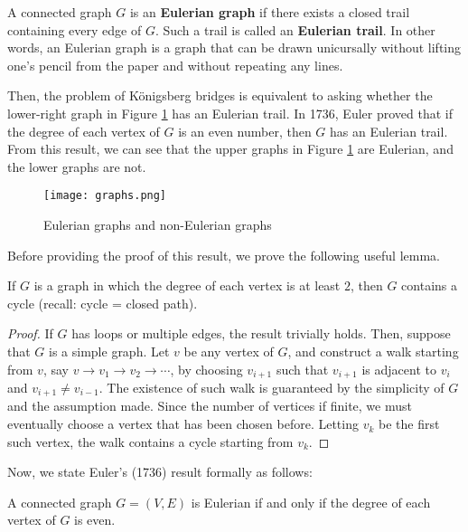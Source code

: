 \documentclass[11pt, A4paper, openany, uplatex]{book}
\begin{document}
\begin{appendices}
A connected graph $G$ is an \textbf{Eulerian graph} if there exists a closed trail containing every edge of $G$.
Such a trail is called an \textbf{Eulerian trail}.
In other words, an Eulerian graph is a graph that can be drawn unicursally without lifting one's pencil from the paper and without repeating any lines.

Then, the problem of K\"onigsberg bridges is equivalent to asking whether the lower-right graph in Figure \ref{fig:euler} has an Eulerian trail.
In 1736, Euler proved that if the degree of each vertex of $G$ is an even number, then $G$ has an Eulerian trail.
From this result, we can see that the upper graphs in Figure \ref{fig:euler} are Eulerian, and the lower graphs are not.

\begin{figure}[h!]
	\begin{center}
		\texttt{[image: graphs.png]}
		\caption{Eulerian graphs and non-Eulerian graphs\label{fig:euler}}
	\end{center}
\end{figure}

Before providing the proof of this result, we prove the following useful lemma.
\begin{lemma}\label{lem:cycle}
	If $G$ is a graph in which the degree of each vertex is at least $2$, then $G$ contains a cycle (recall: cycle = closed path).
\end{lemma}

\begin{proof}
	If $G$ has loops or multiple edges, the result trivially holds.
	Then, suppose that $G$ is a simple graph.
	Let $v$ be any vertex of $G$, and construct a walk starting from $v$, say $v \to v_1 \to v_2 \to \cdots $, by choosing $v_{i+1}$ such that $v_{i+1}$ is adjacent to $v_i$ and $v_{i+1} \neq v_{i-1}$.
	The existence of such walk is guaranteed by the simplicity of $G$ and the assumption made.
	Since the number of vertices if finite, we must eventually choose a vertex that has been chosen before.
	Letting $v_k$ be the first such vertex, the walk contains a cycle starting from $v_k$.
\end{proof}

Now, we state Euler's (1736) result formally as follows:
\begin{theorem}
	A connected graph $G = (V,E)$ is Eulerian if and only if the degree of each vertex of $G$ is even.
\end{theorem}


\end{appendices}
\end{document}
